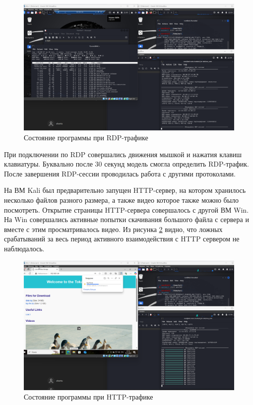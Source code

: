 \documentclass[spec, och, diploma]{SCWorks}
\begin{document}
\begin{figure}[H]
  \centering
  \includegraphics[width=1.0\textwidth]{pics/new1.png}
  \caption{Состояние программы при RDP-трафике}
  \label{rdp1}
\end{figure}

При подключении по RDP совершались движения мышкой и нажатия клавиш клавиатуры. Буквально после 30 секунд
модель смогла определить RDP-трафик. После завершения RDP-сессии проводилась работа с другими протоколами.

На ВМ Kali был предварительно запущен HTTP-сервер, на котором хранилось несколько файлов разного размера, а также 
видео которое также можно было посмотреть. Открытие страницы HTTP-сервера совершалось с другой ВМ Win. На Win 
совершались активные попытки скачивания большого файла с сервера и вместе с этим просматривалось видео. Из рисунка \ref{http1}
видно, что ложных срабатываний за весь период активного взаимодействия с HTTP сервером не наблюдалось.

\begin{figure}[H]
  \centering
  \includegraphics[width=1.0\textwidth]{pics/new2.png}
  \caption{Состояние программы при HTTP-трафике}
  \label{http1}
\end{figure}
\end{document}
